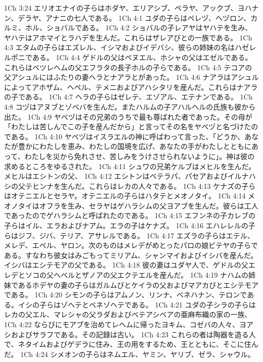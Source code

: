 1Ch 3:24  エリオエナイの子らはホダヤ、エリアシブ、ペラヤ、アックブ、ヨハナン、デラヤ、アナニの七人である。
1Ch 4:1  ユダの子らはペレヅ、ヘヅロン、カルミ、ホル、ショバルである。
1Ch 4:2  ショバルの子レアヤはヤハテを生み、ヤハテはアホマイとラハデを生んだ。これらはザレアびとの一族である。
1Ch 4:3  エタムの子らはエズレル、イシマおよびイデバシ、彼らの姉妹の名はハゼレルポニである。
1Ch 4:4  ゲドルの父はペヌエル、ホシャの父はエゼルである。これらはベツレヘムの父エフラタの長子ホルの子らである。
1Ch 4:5  テコアの父アシュルにはふたりの妻ヘラとナアラとがあった。
1Ch 4:6  ナアラはアシュルによってアホザム、ヘペル、テメニおよびアハシタリを産んだ。これらはナアラの子である。
1Ch 4:7  ヘラの子らはゼレテ、エゾアル、エテナンである。
1Ch 4:8  コヅはアヌブとゾベバを生んだ。またハルムの子アハルヘルの氏族も彼から出た。
1Ch 4:9  ヤベヅはその兄弟のうちで最も尊ばれた者であった。その母が「わたしは苦しんでこの子を産んだから」と言ってその名をヤベヅと名づけたのである。
1Ch 4:10  ヤベヅはイスラエルの神に呼ばわって言った、「どうか、あなたが豊かにわたしを恵み、わたしの国境を広げ、あなたの手がわたしとともにあって、わたしを災から免れさせ、苦しみをうけさせられないように」。神は彼の求めるところをゆるされた。
1Ch 4:11  シュワの兄弟ケルブはメヒルを生んだ。メヒルはエシトンの父、
1Ch 4:12  エシトンはベテラパ、パセアおよびイルナハシの父テヒンナを生んだ。これらはレカの人々である。
1Ch 4:13  ケナズの子らはオテニエルとセラヤ。オテニエルの子らはハタテとメオノタイ。
1Ch 4:14  メオノタイはオフラを生み、セラヤはゲハラシムの父ヨアブを生んだ。彼らは工人であったのでゲハラシムと呼ばれたのである。
1Ch 4:15  エフンネの子カレブの子らはイル、エラおよびナアム。エラの子はケナズ。
1Ch 4:16  エハレレルの子らはジフ、ジバ、テリア、アサレルである。
1Ch 4:17  エズラの子らはエテル、メレデ、エペル、ヤロン。次のものはメレデがめとったパロの娘ビテヤの子らである。すなわち彼女はみごもってミリアム、シャンマイおよびイシバを産んだ。イシバはエシテモアの父である。
1Ch 4:18  彼の妻はユダヤ人で、ゲドルの父エレデとソコの父ヘベルとザノアの父エクテエルを産んだ。
1Ch 4:19  ナハムの姉妹であるホデヤの妻の子らはガルムびとケイラの父およびマアカびとエシテモアである。
1Ch 4:20  シモンの子らはアムノン、リンナ、ベネハナン、テロンである。イシの子らはゾヘテとベネゾヘテである。
1Ch 4:21  ユダの子シラの子らはレカの父エル、マレシャの父ラダおよびベテアシベアの亜麻布織の家の一族、
1Ch 4:22  ならびにモアブを治めてレヘムに帰ったヨキム、コゼバの人々、ヨアシおよびサラフである。その記録は古い。
1Ch 4:23  これらの者は陶器を造る人で、ネタイムおよびゲデラに住み、王の用をするため、王とともに、そこに住んだ。
1Ch 4:24  シメオンの子らはネムエル、ヤミン、ヤリブ、ゼラ、シャウル。
